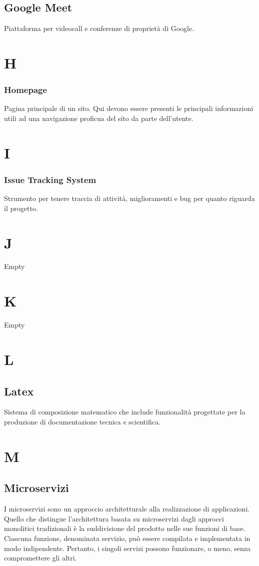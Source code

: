 \subsection*{Google Meet}
Piattaforma per videocall e conferenze di proprietà di Google.

\section*{H}
\subsubsection*{Homepage}
Pagina principale di un sito. Qui devono essere presenti le principali informazioni utili ad una navigazione proficua del
sito da parte dell'utente.

\section*{I}
\subsubsection*{Issue Tracking System}
Strumento per tenere traccia di attività, miglioramenti e bug per quanto riguarda il progetto.

\section*{J}
Empty

\section*{K}
Empty

\section*{L}
\subsection*{Latex}
Sistema di composizione matematico che include funzionalità progettate per la produzione di documentazione tecnica e scientifica.

\section*{M}
\subsection*{Microservizi}
I microservizi sono un approccio architetturale alla realizzazione di applicazioni. 
Quello che distingue l'architettura basata su microservizi dagli approcci monolitici tradizionali 
è la suddivisione del prodotto nelle sue funzioni di base. Ciascuna funzione, denominata servizio, può essere 
compilata e implementata in modo indipendente. Pertanto, i singoli servizi possono funzionare, o meno, senza compromettere gli altri.

